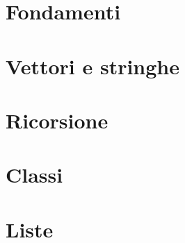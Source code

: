 \documentclass[a4paper,12pt,twoside]{book}
\begin{document}
\tableofcontents

\chapter{Fondamenti}



\chapter{Vettori e stringhe}



\chapter{Ricorsione}

\chapter{Classi}


\chapter{Liste}

\end{document}
